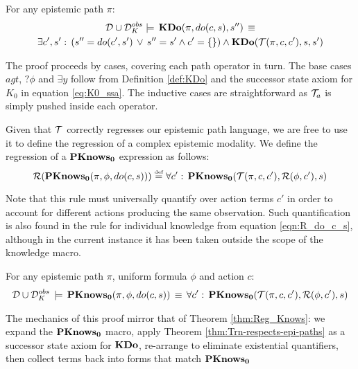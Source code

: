 \begin{thm}
\label{thm:Trn-respects-epi-paths}For any epistemic path $\pi$:\begin{multline*}
\mathcal{D}\cup\mathcal{D}_{K}^{obs}\models\,\mathbf{KDo}(\pi,do(c,s),s'')\,\equiv\\
\exists c',s':\,\left(s''=do(c',s')\,\vee\, s''=s'\wedge c'=\{\}\right)\wedge\mathbf{KDo}(\mathcal{T}(\pi,c,c'),s,s')\end{multline*}

\end{thm}
\begin{proofsketch}
The proof proceeds by cases, covering each path operator in turn.
The base cases $agt$, $?\phi$ and $\exists y$ follow from Definition
\ref{def:KDo} and the successor state axiom for $K_{0}$ in equation
\eqref{eq:K0_ssa}. The inductive cases are straightforward as $\mathcal{T}_{a}$
is simply pushed inside each operator. 
\end{proofsketch}
Given that $\mathcal{T}$ correctly regresses our epistemic path language,
we are free to use it to define the regression of a complex epistemic
modality. We define the regression of a $\mathbf{PKnows_{0}}$ expression as
follows:\[
\mathcal{R}(\mathbf{PKnows_{0}}(\pi,\phi,do(c,s)))\stackrel{\mbox{\tiny def}}{=}\forall c':\,\mathbf{PKnows_{0}}(\mathcal{T}(\pi,c,c'),\mathcal{R}(\phi,c'),s)\]


Note that this rule must universally quantify over action terms $c'$
in order to account for different actions producing the same observation.
Such quantification is also found in the rule for individual knowledge
from equation \eqref{eqn:R_do_c_s}, although in the current instance
it has been taken outside the scope of the knowledge macro.

\begin{thm}
\label{thm:Reg_PKnowsZ}For any epistemic path $\pi$, uniform formula
$\phi$ and action $c$:\begin{gather*}
\mathcal{D}\cup\mathcal{D}_{K}^{obs}\,\models\,\mathbf{PKnows_{0}}(\pi,\phi,do(c,s))\,\equiv\,\forall c':\,\mathbf{PKnows_{0}}(\mathcal{T}(\pi,c,c'),\mathcal{R}(\phi,c'),s)\end{gather*}

\end{thm}
\begin{proofsketch}
The mechanics of this proof mirror that of Theorem \ref{thm:Reg_Knows}:
we expand the $\mathbf{PKnows_{0}}$ macro, apply Theorem \ref{thm:Trn-respects-epi-paths}
as a successor state axiom for $\mathbf{KDo}$, re-arrange to eliminate existential
quantifiers, then collect terms back into forms that match $\mathbf{PKnows_{0}}$ 
\end{proofsketch}

